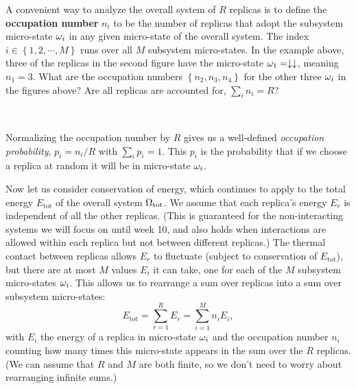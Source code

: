 A convenient way to analyze the overall system of $R$ replicas is to define the \textbf{occupation number} $n_i$ to be the number of replicas that adopt the subsystem micro-state $\omega_i$ in any given micro-state of the overall system.
The index $i \in \left\{1, 2, \cdots, M\right\}$ runs over all $M$ subsystem micro-states.
In the example above, three of the replicas in the second figure have the micro-state $\omega_1 = \downarrow\downarrow$, meaning $n_1 = 3$.
What are the occupation numbers $\left\{n_2, n_3, n_4\right\}$ for the other three $\omega_i$ in the figures above?
Are all replicas are accounted for, $\sum_i n_i = R$?
\begin{mdframed}
  \ \\[50 pt]
\end{mdframed}
Normalizing the occupation number by $R$ gives us a well-defined \textit{occupation probability}, $p_i = n_i / R$ with $\sum_i p_i = 1$.
This $p_i$ is the probability that if we choose a replica at random it will be in micro-state $\omega_i$.

Now let us consider conservation of energy, which continues to apply to the total energy $E_{\text{tot}}$ of the overall system $\Omega_{\text{tot}}$.
We assume that each replica's energy $E_r$ is independent of all the other replicas.
(This is guaranteed for the non-interacting systems we will focus on until week 10, and also holds when interactions are allowed within each replica but not between different replicas.)
The thermal contact between replicas allows $E_r$ to fluctuate (subject to conservation of $E_{\text{tot}}$), but there are at most $M$ values $E_i$ it can take, one for each of the $M$ subsystem micro-states $\omega_i$.
This allows us to rearrange a sum over replicas into a sum over subsystem micro-states:
\begin{equation}
  \label{eq:canon_Etot}
  E_{\text{tot}} = \sum_{r = 1}^R E_r = \sum_{i = 1}^M n_i E_i,
\end{equation}
with $E_i$ the energy of a replica in micro-state $\omega_i$ and the occupation number $n_i$ counting how many times this micro-state appears in the sum over the $R$ replicas.
(We can assume that $R$ and $M$ are both finite, so we don't need to worry about rearranging infinite sums.)



